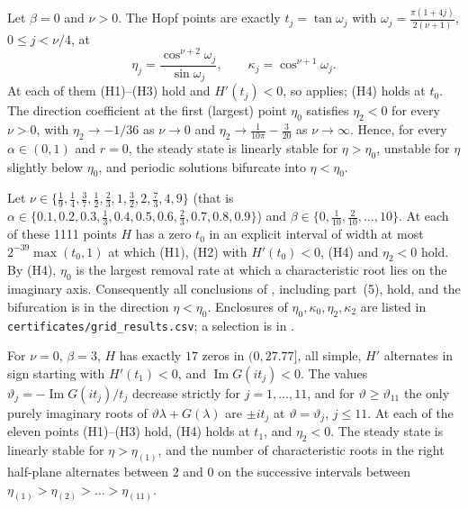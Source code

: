 \documentclass[11pt,a4paper]{report}
\newcommand{\vth}{\vartheta}
\begin{document}
\begin{theorem}[size-independent removal, $\beta=0$]\label{thm:B}
Let $\beta=0$ and $\nu>0$. The Hopf points are exactly $t_j=\tan\omega_j$ with $\omega_j=\frac{\pi(1+4j)}{2(\nu+1)}$, $0\le j<\nu/4$, at
\[
\eta_j=\frac{\cos^{\nu+2}\omega_j}{\sin\omega_j},\qquad \kappa_j=\cos^{\nu+1}\omega_j .
\]
At each of them (H1)--(H3) hold and $H'(t_j)<0$, so  applies; (H4) holds at $t_0$. The direction coefficient at the first (largest) point $\eta_0$ satisfies $\eta_2<0$ for every $\nu>0$, with $\eta_2\to-1/36$ as $\nu\to0$ and $\eta_2\to\frac1{10\pi}-\frac3{20}$ as $\nu\to\infty$. Hence, for every $\alpha\in(0,1)$ and $r=0$, the steady state is linearly stable for $\eta>\eta_0$, unstable for $\eta$ slightly below $\eta_0$, and periodic solutions bifurcate into $\eta<\eta_0$.
\end{theorem}

\begin{theorem}\label{thm:C}
Let $\nu\in\{\frac19,\frac14,\frac37,\frac12,\frac23,1,\frac32,2,\frac73,4,9\}$ (that is $\alpha\in\{0.1,0.2,0.3,\frac13,0.4,0.5,0.6,\frac23,0.7,0.8,0.9\}$) and $\beta\in\{0,\frac1{10},\frac2{10},\dots,10\}$. At each of these 1111 points $H$ has a zero $t_0$ in an explicit interval of width at most $2^{-39}\max(t_0,1)$ at which (H1), (H2) with $H'(t_0)<0$, (H4) and $\eta_2<0$ hold. By (H4), $\eta_0$ is the largest removal rate at which a characteristic root lies on the imaginary axis. Consequently all conclusions of , including part~(5), hold, and the bifurcation is in the direction $\eta<\eta_0$. Enclosures of $\eta_0,\kappa_0,\eta_2,\kappa_2$ are listed in \texttt{certificates/grid\_results.csv}; a selection is in .
\end{theorem}

\begin{theorem}[$\nu=0$, $\beta=3$]\label{thm:D}
For $\nu=0$, $\beta=3$, $H$ has exactly $17$ zeros in $(0,27.77]$, all simple, $H'$ alternates in sign starting with $H'(t_1)<0$, and $\operatorname{Im}G(it_j)<0$. The values $\vth_j=-\operatorname{Im}G(it_j)/t_j$ decrease strictly for $j=1,\dots,11$, and for $\vth\ge\vth_{11}$ the only purely imaginary roots of $\vth\lambda+G(\lambda)$ are $\pm it_j$ at $\vth=\vth_j$, $j\le 11$. At each of the eleven points (H1)--(H3) hold, (H4) holds at $t_1$, and $\eta_2<0$. The steady state is linearly stable for $\eta>\eta_{(1)}$, and the number of characteristic roots in the right half-plane alternates between $2$ and $0$ on the successive intervals between $\eta_{(1)}>\eta_{(2)}>\dots>\eta_{(11)}$.
\end{theorem}
\end{document}
